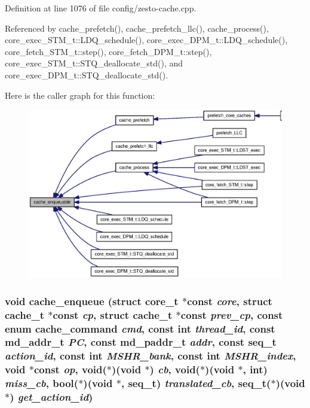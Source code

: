 Definition at line 1076 of file config/zesto-cache.cpp.

Referenced by cache\_\-prefetch(), cache\_\-prefetch\_\-llc(), cache\_\-process(), core\_\-exec\_\-STM\_\-t::LDQ\_\-schedule(), core\_\-exec\_\-DPM\_\-t::LDQ\_\-schedule(), core\_\-fetch\_\-STM\_\-t::step(), core\_\-fetch\_\-DPM\_\-t::step(), core\_\-exec\_\-STM\_\-t::STQ\_\-deallocate\_\-std(), and core\_\-exec\_\-DPM\_\-t::STQ\_\-deallocate\_\-std().

Here is the caller graph for this function:\nopagebreak
\begin{figure}[H]
\begin{center}
\leavevmode
\includegraphics[width=420pt]{config_2zesto-cache_8cpp_35c7c82c117f5713ec55d40f831060da_icgraph}
\end{center}
\end{figure}
\subsubsection[{cache\_\-enqueue}]{\setlength{\rightskip}{0pt plus 5cm}void cache\_\-enqueue (struct {\bf core\_\-t} $\ast$const  {\em core}, \/  struct {\bf cache\_\-t} $\ast$const  {\em cp}, \/  struct {\bf cache\_\-t} $\ast$const  {\em prev\_\-cp}, \/  const enum {\bf cache\_\-command} {\em cmd}, \/  const int {\em thread\_\-id}, \/  const {\bf md\_\-addr\_\-t} {\em PC}, \/  const {\bf md\_\-paddr\_\-t} {\em addr}, \/  const {\bf seq\_\-t} {\em action\_\-id}, \/  const int {\em MSHR\_\-bank}, \/  const int {\em MSHR\_\-index}, \/  void $\ast$const  {\em op}, \/  void($\ast$)(void $\ast$) {\em cb}, \/  void($\ast$)(void $\ast$, int) {\em miss\_\-cb}, \/  bool($\ast$)(void $\ast$, {\bf seq\_\-t}) {\em translated\_\-cb}, \/  {\bf seq\_\-t}($\ast$)(void $\ast$) {\em get\_\-action\_\-id})}\label{config_2zesto-cache_8cpp_0831369c0f015a2e350b71f2fc445c70}




